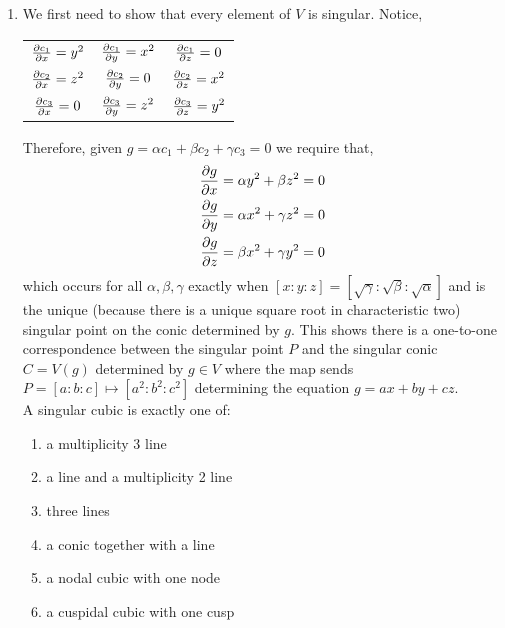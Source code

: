 \documentclass[12pt]{article}
\begin{document}
\begin{enumerate}
\item We first need to show that every element of $V$ is singular. Notice,
\begin{center}
\begin{tabular}{c|c|c}
$\frac{\partial{c_1}}{\partial{x}} = y^2$ & $\frac{\partial{c_1}}{\partial{y}} = x^2$ & $\frac{\partial{c_1}}{\partial{z}} = 0$
\\
$\frac{\partial{c_2}}{\partial{x}} = z^2$ & $\frac{\partial{c_2}}{\partial{y}} = 0$ & $\frac{\partial{c_2}}{\partial{z}} = x^2$
\\
$\frac{\partial{c_3}}{\partial{x}} = 0$ & $\frac{\partial{c_3}}{\partial{y}} = z^2$ & $\frac{\partial{c_3}}{\partial{z}} = y^2$
\end{tabular}
\end{center}
Therefore, given $g = \alpha c_1 + \beta c_2 + \gamma c_3 = 0$ we require that,
\begin{align*}
\frac{\partial{g}}{\partial{x}} & = \alpha y^2 + \beta z^2 = 0 
\\
\frac{\partial{g}}{\partial{y}} & = \alpha x^2 + \gamma z^2 = 0 
\\
\frac{\partial{g}}{\partial{z}} & = \beta x^2 + \gamma y^2 = 0
\end{align*}
which occurs for all $\alpha, \beta, \gamma$ exactly when $[x:y:z] = [\sqrt{\gamma} : \sqrt{\beta} : \sqrt{\alpha}]$ and is the unique (because there is a unique square root in characteristic two) singular point on the conic determined by $g$. This shows there is a one-to-one correspondence between the singular point $P$ and the singular conic $C = V(g)$ determined by $g \in V$ where the map sends $P = [a : b : c] \mapsto [a^2 : b^2 : c^2]$ determining the equation $g = a x + b y + c z$.
\bigskip\\
A singular cubic is exactly one of:
\begin{enumerate}
\item a multiplicity 3 line
\item a line and a multiplicity 2 line
\item three lines
\item a conic together with a line
\item a nodal cubic with one node
\item a cuspidal cubic with one cusp
\end{enumerate}


\end{enumerate}
\end{document}

